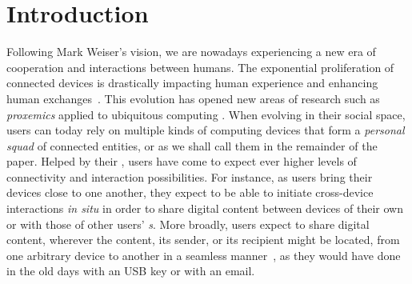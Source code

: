 \section{Introduction}

Following Mark Weiser's vision, we are nowadays
experiencing a new era of cooperation and interactions between humans.
The exponential proliferation of connected devices is
drastically impacting human experience and enhancing human
exchanges~\cite{Dearman:2008, Oh:2017, Sohn:2008,Harper08}. This evolution has opened new areas of research such as
\textit{proxemics} applied to ubiquitous computing
\cite{Marquardt:2011}. When evolving in their social space, users can today rely on
multiple kinds of computing devices that form a \textit{personal squad} of connected entities, or \squad as we shall call them in the remainder of the
paper. Helped by their \squad, users
have come to expect ever higher levels of connectivity and interaction
possibilities. For instance, as users bring
their devices close to one another, they expect to be able to initiate cross-device
interactions \textit{in situ} in order to share digital content
\cite{Oh:2017} between devices of their own \squad or with those of other users' \squad{}\emph{s}. More broadly, users expect to share digital content,
wherever the content, its sender, or its recipient might be located, from one
arbitrary device to another in a seamless manner~\cite{Dearman:2008}, as they
would have done in the old days with an USB key or with an email. 

